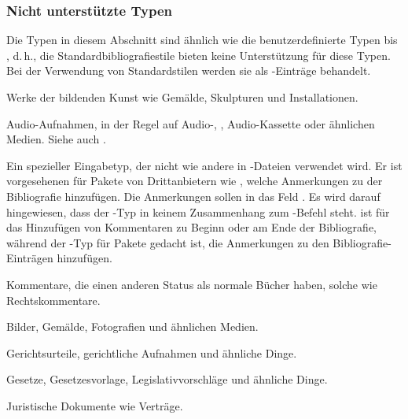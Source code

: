 \documentclass{ltxdockit}[2011/03/25]
\begin{document}
\subsubsection{Nicht unterstützte Typen} \label{bib:typ:ctm}

Die Typen in diesem Abschnitt sind ähnlich wie die benutzerdefinierte Typen
 bis , d.\,h., die Standardbibliografiestile bieten keine Unterstützung für diese Typen. Bei der Verwendung von
Standardstilen werden sie als -Einträge behandelt.

\begin{typelist}


Werke der bildenden Kunst wie Gemälde, Skulpturen und Installationen. 


Audio-Aufnahmen, in der Regel auf Audio-, , Audio-Kassette oder
ähnlichen Medien. Siehe auch .


Ein spezieller Eingabetyp, der nicht wie andere in -Dateien verwendet
wird. Er ist vorgesehenen für Pakete von Drittanbietern wie ,
welche Anmerkungen zu der Bibliografie hinzufügen. Die Anmerkungen sollen in
das Feld . Es wird darauf hingewiesen, dass der
-Typ in keinem Zusammenhang zum -Befehl steht.
 ist für das Hinzufügen von Kommentaren zu Beginn oder am Ende
der Bibliografie, während der -Typ für Pakete gedacht ist, die
Anmerkungen zu den Bibliografie-Einträgen hinzufügen. 


Kommentare, die einen anderen Status als normale Bücher haben, solche wie 
Rechtskommentare.


Bilder, Gemälde, Fotografien und ähnlichen Medien. 


Gerichtsurteile, gerichtliche Aufnahmen und ähnliche Dinge. 


Gesetze, Gesetzesvorlage, Legislativvorschläge und ähnliche Dinge. 


Juristische Dokumente wie Verträge.


\end{typelist}
\end{document}
